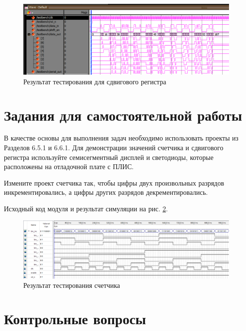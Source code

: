 \documentclass[a4paper,14pt]{article}
\begin{document}
	\begin{figure}[H]
		\centering
		\includegraphics[width=\linewidth]{images/z6_test}
		\caption{Результат тестирования для сдвигового регистра}
		\label{fig:z6_test}
	\end{figure}
	
	
	\section{Задания для самостоятельной работы}
	
	В качестве основы для выполнения задач необходимо использовать проекты из
	Разделов 6.5.1 и 6.6.1. Для демонстрации значений счетчика и сдвигового регистра
	используйте семисегментный дисплей и светодиоды, которые расположены на отладочной
	плате с ПЛИС.
	
	Измените проект счетчика так, чтобы цифры двух произвольных разрядов
	инкрементировались, а цифры других разрядов декрементировались.
			
	Исходный код модуля и результат симуляции на рис. \ref{fig:dop_test}.
	
	
	\begin{figure}[H]
		\centering
		\includegraphics[width=\linewidth]{images/dop_test}
		\caption{Результат тестирования счетчика}
		\label{fig:dop_test}
	\end{figure}
	\section{Контрольные вопросы}
	
\end{document}
